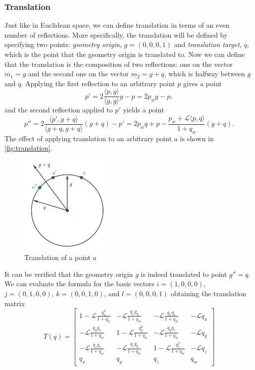 \subsubsection{Translation}
Just like in Euclidean space, we can define translation in terms of an even number of reflections.
More specifically, the translation will be defined by specifying two points: \textit{geometry origin}, $g = (0, 0, 0, 1)$ and \textit{translation target}, $q$, which is the point that the geometry origin is translated to.
Now we can define that the translation is the composition of two reflections: one on the vector $m_1 = g$ and the second one on the vector $m_2 = g + q$, which is halfway between $g$ and $q$.
Applying the first reflection to an arbitrary point $p$ gives a point
$$p' = 2 \frac{\langle p, g \rangle}{\langle g, g \rangle}g - p = 2p_w g - p,$$
and the second reflection applied to $p'$ yields a point
\begin{equation} \label{eq:translation}
    p'' = 2 \frac{\langle p', g + q \rangle}{\langle g + q, g + q \rangle}(g + q) - p'
    = 2 p_w q + p - \frac{p_w + \mathcal{L}\langle p, q \rangle}{1 + q_w}(g + q).
\end{equation}
The effect of applying translation to an arbitrary point $a$ is shown in \autoref{fig:translation}.\\
\begin{figure}[h]
    \centering
    \includegraphics[width=0.4\textwidth]{chapters/theoretical_foundations/sections/non-eudlidean-spaces/resources/translation.png}
    \caption{Translation of a point $a$}
    \label{fig:translation}
\end{figure}
It can be verified that the geometry origin $g$ is indeed translated to point $g'' = q$.
We can evaluate the formula for the basis vectors $i = (1, 0, 0, 0)$, $j = (0, 1, 0, 0)$, $k = (0, 0, 1, 0)$, and $l = (0, 0, 0, 1)$ obtaining the translation matrix
$$
    T(q) = \begin{bmatrix}
        1 - \mathcal{L}\frac{q_x^2}{1 + q_w} & -\mathcal{L}\frac{q_x q_y}{1 + q_w}  & -\mathcal{L}\frac{q_x q_z}{1 + q_w}  & -\mathcal{L} q_x \\
        -\mathcal{L}\frac{q_y q_x}{1 + q_w}  & 1 - \mathcal{L}\frac{q_y^2}{1 + q_w} & -\mathcal{L}\frac{q_y q_z}{1 + q_w}  & -\mathcal{L} q_y \\
        -\mathcal{L}\frac{q_z q_x}{1 + q_w}  & -\mathcal{L}\frac{q_z q_y}{1 + q_w}  & 1 - \mathcal{L}\frac{q_z^2}{1 + q_w} & -\mathcal{L} q_z \\
        q_x                                  & q_y                                  & q_z                                  & q_w
    \end{bmatrix}
$$

